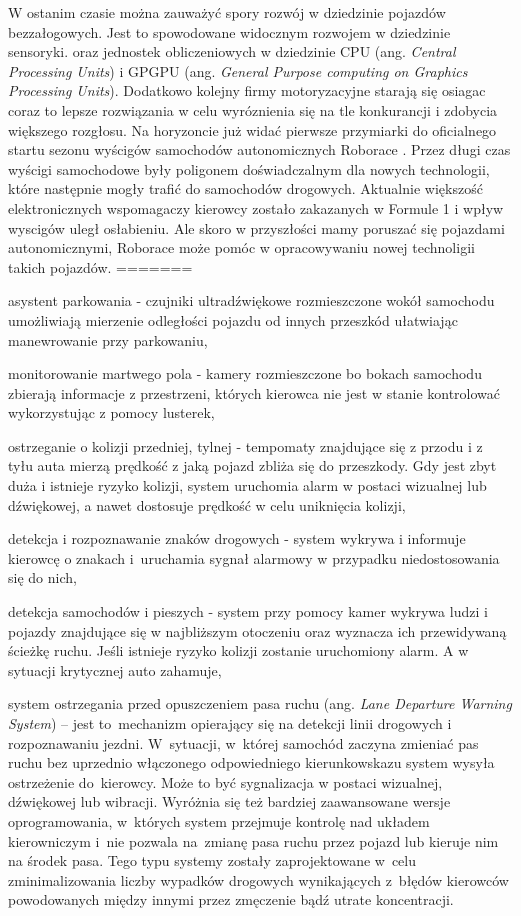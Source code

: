 

W ostanim czasie można zauważyć spory rozwój w dziedzinie pojazdów bezzałogowych. Jest to spowodowane widocznym rozwojem w dziedzinie sensoryki. oraz jednostek obliczeniowych w dziedzinie CPU (ang. \textit{Central Processing Units}) i GPGPU (ang. \textit{General Purpose computing on Graphics Processing Units}). Dodatkowo kolejny firmy motoryzacyjne starają się osiagac coraz to lepsze rozwiązania w celu wyróznienia się na tle konkurancji i zdobycia większego rozgłosu. Na horyzoncie już widać pierwsze przymiarki do oficialnego startu sezonu wyścigów samochodów autonomicznych Roborace \cite{roborace}. Przez długi czas wyścigi samochodowe były poligonem doświadczalnym dla nowych technologii, które następnie mogły trafić do samochodów drogowych. Aktualnie większość elektronicznych wspomagaczy kierowcy zostało zakazanych w Formule 1 i wpływ wyscigów uległ osłabieniu. Ale skoro w przyszłości mamy poruszać się pojazdami autonomicznymi, Roborace może pomóc w opracowywaniu nowej technoligii takich pojazdów.
=======
	\item asystent parkowania - czujniki ultradźwiękowe rozmieszczone wokół samochodu umożliwiają mierzenie odległości pojazdu od innych przeszkód ułatwiając manewrowanie przy parkowaniu,
	\item monitorowanie martwego pola - kamery rozmieszczone bo bokach samochodu zbierają informacje z przestrzeni, których kierowca nie jest w stanie kontrolować wykorzystując z pomocy lusterek,
	\item ostrzeganie o kolizji przedniej, tylnej - tempomaty znajdujące się z przodu i z tyłu auta mierzą prędkość z jaką pojazd zbliża się do przeszkody. Gdy jest zbyt duża i istnieje ryzyko kolizji, system uruchomia alarm w postaci wizualnej lub dźwiękowej, a nawet dostosuje prędkość w celu uniknięcia kolizji,
	\item detekcja i rozpoznawanie znaków drogowych - system wykrywa i informuje kierowcę o znakach i~uruchamia sygnał alarmowy w przypadku niedostosowania się do nich,
	\item detekcja samochodów i pieszych - system przy pomocy kamer wykrywa ludzi i pojazdy znajdujące się w najbliższym otoczeniu oraz wyznacza ich przewidywaną ścieżkę ruchu. Jeśli istnieje ryzyko kolizji zostanie uruchomiony alarm. A w sytuacji krytycznej auto zahamuje,
	\item system ostrzegania przed opuszczeniem pasa ruchu (ang. \textit{Lane Departure Warning System}) -- jest to~mechanizm opierający się na detekcji linii drogowych i rozpoznawaniu jezdni. W~sytuacji, w~której samochód zaczyna zmieniać pas ruchu bez uprzednio włączonego odpowiedniego kierunkowskazu system wysyła ostrzeżenie do~kierowcy. Może to być sygnalizacja w postaci wizualnej, dźwiękowej lub wibracji. Wyróżnia się też bardziej zaawansowane wersje oprogramowania, w~których system przejmuje kontrolę nad układem kierowniczym i~nie pozwala na~zmianę pasa ruchu przez pojazd lub kieruje nim na środek pasa. Tego typu systemy zostały zaprojektowane w~celu zminimalizowania liczby wypadków drogowych wynikających z~błędów kierowców powodowanych między innymi przez zmęczenie bądź utrate koncentracji.
